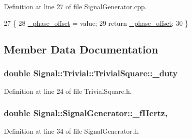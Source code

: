 Definition at line 27 of file Signal\+Generator.\+cpp.


\begin{DoxyCode}
27                                                                    \{
28     \hyperlink{classSignal_1_1SignalGenerator_a6b4444d46747c8517171edbbf4b5588f}{\_phase\_offset} = value;
29     \textcolor{keywordflow}{return} \hyperlink{classSignal_1_1SignalGenerator_a6b4444d46747c8517171edbbf4b5588f}{\_phase\_offset};
30 \}
\end{DoxyCode}


\subsection{Member Data Documentation}
\hypertarget{classSignal_1_1Trivial_1_1TrivialSquare_a25004ceafc7c954fdfbe99a8b356badf}{
\subsubsection[{\+\_\+duty}]{\setlength{\rightskip}{0pt plus 5cm}double Signal\+::\+Trivial\+::\+Trivial\+Square\+::\+\_\+duty\hspace{0.3cm}{\ttfamily [protected]}}}\label{classSignal_1_1Trivial_1_1TrivialSquare_a25004ceafc7c954fdfbe99a8b356badf}


Definition at line 24 of file Trivial\+Square.\+h.

\hypertarget{classSignal_1_1SignalGenerator_a85a4702347352bab1c71e0a8df8437d6}{
\subsubsection[{\+\_\+f\+Hertz}]{\setlength{\rightskip}{0pt plus 5cm}double Signal\+::\+Signal\+Generator\+::\+\_\+f\+Hertz\hspace{0.3cm}{\ttfamily [protected]}, {\ttfamily [inherited]}}}\label{classSignal_1_1SignalGenerator_a85a4702347352bab1c71e0a8df8437d6}


Definition at line 34 of file Signal\+Generator.\+h.

